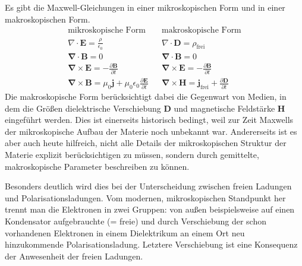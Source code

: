 Es gibt die Maxwell-Gleichungen in einer mikroskopischen Form und in einer makroskopischen Form.
%
\begin{align}
\text{mikroskopische Form} & &
\text{makroskopische Form} \nonumber \\
%
 \nabla\cdot\mathbf{E}= \frac{\rho}{\epsilon_0} & &
 \nabla\cdot\mathbf{D}= \rho_{\text{frei}} \\
%
\mathbf\nabla\cdot\mathbf{B}=0
 & &
\mathbf\nabla\cdot\mathbf{B}=0 \\
%
\mathbf\nabla\times\mathbf{E}=-\frac{\partial\mathbf{B}}{\partial t}  
& &
\mathbf\nabla\times\mathbf{E}=-\frac{\partial\mathbf{B}}{\partial t} \\
%
\mathbf\nabla\times\mathbf{B}= \mu_0\mathbf{j}+\mu_0\epsilon_0\frac{\partial\mathbf{E}}{\partial t}  & &
\mathbf\nabla\times\mathbf{H}= \mathbf{j}_{\text{frei}}+\frac{\partial\mathbf{D}}{\partial t}
\end{align}
%
Die makroskopische Form berücksichtigt dabei die Gegenwart von Medien, in dem die Größen dielektrische Verschiebung $\mathbf{D}$ und magnetische Feldstärke $\mathbf{H}$ eingeführt werden. Dies ist einerseits historisch bedingt, weil zur Zeit Maxwells der mikroskopische Aufbau der Materie noch unbekannt war. Andererseits ist es aber auch heute hilfreich, nicht alle Details der mikroskopischen Struktur der Materie explizit berücksichtigen zu müssen, sondern durch gemittelte, makroskopische Parameter beschreiben zu können.

Besonders deutlich wird dies bei der Unterscheidung zwischen freien Ladungen und Polarisationsladungen.  Vom modernen, mikroskopischen Standpunkt her trennt man die Elektronen in zwei Gruppen: von außen beispielsweise auf einen Kondensator aufgebrauchte (= freie) und durch Verschiebung der schon vorhandenen Elektronen in einem Dielektrikum an einem Ort neu hinzukommende Polarisationsladung. Letztere Verschiebung ist eine Konsequenz der Anwesenheit der freien Ladungen.

